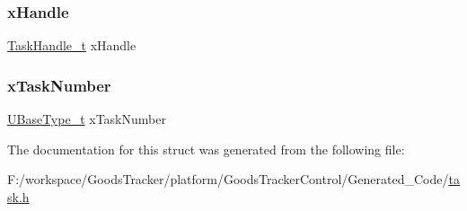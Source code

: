 \mbox{\label{structx_t_a_s_k___s_t_a_t_u_s_a01ba122aba7d048809e2330ee6cbe218}} 
\subsubsection{\texorpdfstring{x\+Handle}{xHandle}}
{\footnotesize\ttfamily \hyperlink{task_8h_ae95f44d4cfeb4a599c6cc258d241cb6b}{Task\+Handle\+\_\+t} x\+Handle}

\mbox{\label{structx_t_a_s_k___s_t_a_t_u_s_a93c24142b1453d7b03cc172a24cf1ecf}} 
\subsubsection{\texorpdfstring{x\+Task\+Number}{xTaskNumber}}
{\footnotesize\ttfamily \hyperlink{portmacro_8h_a646f89d4298e4f5afd522202b11cb2e6}{U\+Base\+Type\+\_\+t} x\+Task\+Number}



The documentation for this struct was generated from the following file\+:\begin{DoxyCompactItemize}
\item 
F\+:/workspace/\+Goods\+Tracker/platform/\+Goods\+Tracker\+Control/\+Generated\+\_\+\+Code/\hyperlink{task_8h}{task.\+h}\end{DoxyCompactItemize}
